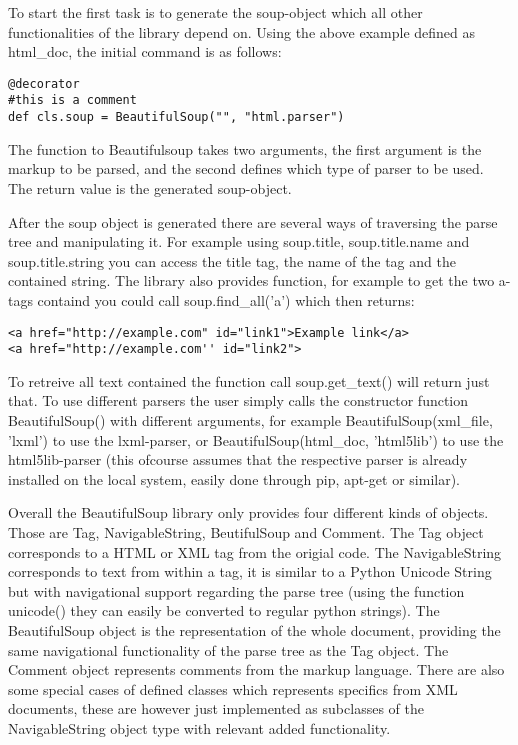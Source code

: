 \documentclass[10pt]{article}
\begin{document}
To start the first task is to generate the soup-object which all other functionalities of the library depend on. Using the above example defined as html\_doc, the initial command is as follows:

\begin{lstlisting}[style = pythonstyle]
@decorator
#this is a comment
def cls.soup = BeautifulSoup("", "html.parser")
\end{lstlisting}
The function to Beautifulsoup takes two arguments, the first argument is the markup to be parsed, and the second defines which type of parser to be used. The return value is the generated soup-object.

After the soup object is generated there are several ways of traversing the parse tree and manipulating it. For example using soup.title, soup.title.name and soup.title.string you can access the title tag, the name of the tag and the contained string. The library also provides function, for example to get the two a-tags containd you could call soup.find\_all('a') which then returns:

\begin{lstlisting}[style = htmlstyle]
<a href="http://example.com" id="link1">Example link</a>
<a href="http://example.com'' id="link2">
\end{lstlisting}

To retreive all text contained the function call soup.get\_text() will return just that.
To use different parsers the user simply calls the constructor function BeautifulSoup() with different arguments, for example BeautifulSoup(xml\_file, 'lxml') to use the lxml-parser, or BeautifulSoup(html\_doc, 'html5lib') to use the html5lib-parser (this ofcourse assumes that the respective parser is already installed on the local system, easily done through pip, apt-get or similar).

Overall the BeautifulSoup library only provides four different kinds of objects. Those are Tag, NavigableString, BeutifulSoup and Comment. The Tag object corresponds to a HTML or XML tag from the origial code. The NavigableString corresponds to text from within a tag, it is similar to a Python Unicode String but with navigational support regarding the parse tree (using the function unicode() they can easily be converted to regular python strings). The BeautifulSoup object is the representation of the whole document, providing the same navigational functionality of the parse tree as the Tag object. The Comment object represents comments from the markup language. There are also some special cases of defined classes which represents specifics from XML documents, these are however just implemented as subclasses of the NavigableString object type with relevant added functionality. 
\end{document}
